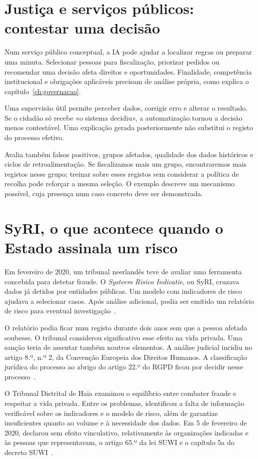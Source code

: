 \section{Justiça e serviços públicos: contestar uma decisão}
Num serviço público conceptual, a IA pode ajudar a localizar regras ou preparar uma minuta. Selecionar pessoas para fiscalização, priorizar pedidos ou recomendar uma decisão afeta direitos e oportunidades. Finalidade, competência institucional e obrigações aplicáveis precisam de análise própria, como explica o capítulo~\ref{ch:governacao}.

Uma supervisão útil permite perceber dados, corrigir erro e alterar o resultado. Se o cidadão só recebe «o sistema decidiu», a automatização tornou a decisão menos contestável. Uma explicação gerada posteriormente não substitui o registo do processo efetivo.

Avalia também falsos positivos, grupos afetados, qualidade dos dados históricos e ciclos de retroalimentação. Se fiscalizamos mais um grupo, encontraremos mais registos nesse grupo; treinar sobre esses registos sem considerar a política de recolha pode reforçar a mesma seleção. O exemplo descreve um mecanismo possível, cuja presença num caso concreto deve ser demonstrada.

\section{SyRI, o que acontece quando o Estado assinala um risco}
Em fevereiro de 2020, um tribunal neerlandês teve de avaliar uma ferramenta concebida para detetar fraude. O \emph{Systeem Risico Indicatie}, ou SyRI, cruzava dados já detidos por entidades públicas. Um modelo com indicadores de risco ajudava a selecionar casos. Após análise adicional, podia ser emitido um relatório de risco para eventual investigação~\citep[§§ 4.27--4.29 e 6.62]{syri2020}.

O relatório podia ficar num registo durante dois anos sem que a pessoa afetada soubesse. O tribunal considerou significativo esse efeito na vida privada. Uma sanção teria de assentar também noutros elementos. A análise judicial incidiu no artigo 8.º, n.º 2, da Convenção Europeia dos Direitos Humanos. A classificação jurídica do processo ao abrigo do artigo 22.º do RGPD ficou por decidir nesse processo~\citep[§§ 6.54--6.60]{syri2020}.

O Tribunal Distrital de Haia examinou o equilíbrio entre combater fraude e respeitar a vida privada. Entre os problemas, identificou a falta de informação verificável sobre os indicadores e o modelo de risco, além de garantias insuficientes quanto ao volume e à necessidade dos dados. Em 5 de fevereiro de 2020, declarou sem efeito vinculativo, relativamente às organizações indicadas e às pessoas que representavam, o artigo 65.º da lei SUWI e o capítulo 5a do decreto SUWI~\citep[§§ 6.49, 6.80, 6.106 e 7.2]{syri2020}.

